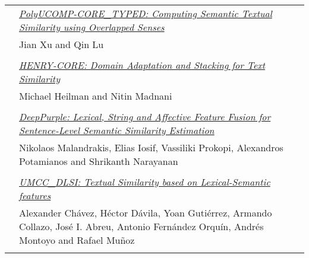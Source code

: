 \begin{tabular}{p{20mm}p{138mm}}
 & \hyperlink{page.91}{\em PolyUCOMP-CORE\_TYPED: Computing Semantic Textual Similarity using Overlapped Senses}\\
         & Jian Xu and Qin Lu \\
\\

 & \hyperlink{page.97}{\em HENRY-CORE: Domain Adaptation and Stacking for Text Similarity}\\
         & Michael Heilman and Nitin Madnani \\
\\

 & \hyperlink{page.104}{\em DeepPurple: Lexical, String and Affective Feature Fusion for Sentence-Level Semantic Similarity Estimation}\\
         & Nikolaos Malandrakis, Elias Iosif, Vassiliki Prokopi, Alexandros Potamianos and Shrikanth Narayanan \\
\\

 & \hyperlink{page.110}{\em UMCC\_DLSI: Textual Similarity based on Lexical-Semantic features}\\
         & Alexander Ch\'{a}vez, H\'{e}ctor D\'{a}vila, Yoan Guti\'{e}rrez, Armando Collazo, Jos\'{e} I. Abreu, Antonio Fern\'{a}ndez Orqu\'{i}n, Andr\'{e}s Montoyo and Rafael Mu\~{n}oz \\
\\

\end{tabular}
\newpage

